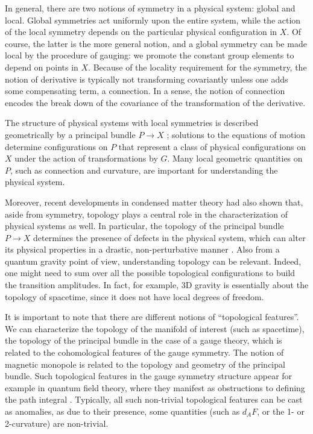 \documentclass[onecolumn]{article}
\theoremstyle{theorem}
\theoremstyle{remark}
\theoremstyle{example}
\theoremstyle{definition}
\numberwithin{equation}{section}
\begin{document}
In general, there are two notions of symmetry in a physical system: { {global}} and { {local}}. Global symmetries act uniformly upon the entire system, while the action of the local symmetry depends on the particular physical configuration in $X$. Of course, the latter is the more general notion, and a global symmetry can be made local by the procedure of { {gauging}}: we promote the constant group elements to depend on points in $X$. Because of the locality requirement for the symmetry, the notion of derivative is typically not transforming covariantly unless one adds some compensating term, a connection. In a sense, the notion of connection encodes the break down of the covariance of the transformation of the derivative.    



The structure of physical systems with  local symmetries is described geometrically by a { {principal bundle}} $P\rightarrow X$ \cite{book-baez}; solutions to the equations of motion determine configurations on $P$ that represent a class of { {physical}} configurations on $X$ under the action of transformations by $G$. Many local geometric quantities on $P$, such as connection and curvature, are important for understanding the physical system.

 

Moreover, recent developments in condensed matter theory \cite{book-wen,Halperin:1978,Bilal:2008} had also shown that, aside from symmetry, topology plays a central role in the characterization of physical systems as well. In particular, the topology of the principal bundle $P\rightarrow X$ determines the presence of { {defects}} in the physical system, which can alter its physical properties in a drastic, non-perturbative manner \cite{Mermin:1979,Freed:2014}. Also from a quantum gravity point of view, understanding topology can be relevant. Indeed, one might need to sum over all the possible topological configurations to build the transition amplitudes. In fact, for example, 3D gravity is essentially about the topology of spacetime, since it does not have local degrees of freedom.

It is important to note that there are different notions of ``topological features''. We can characterize the topology of the manifold of interest (such as spacetime), the topology of the principal bundle in the case of a gauge theory, which is related to the cohomological features of the gauge symmetry. The notion of magnetic monopole is related to the topology and geometry of the principal bundle. Such topological features in the gauge symmetry structure appear for example in quantum field theory, where they manifest as obstructions to defining the path integral \cite{Bilal:2008,adler2004anomalies}. 
Typically, all such non-trivial topological features can be cast as {{anomalies}}, as due to their presence, some quantities (such as $d_AF$, or the 1- or 2-curvature) are non-trivial. 
\end{document}
